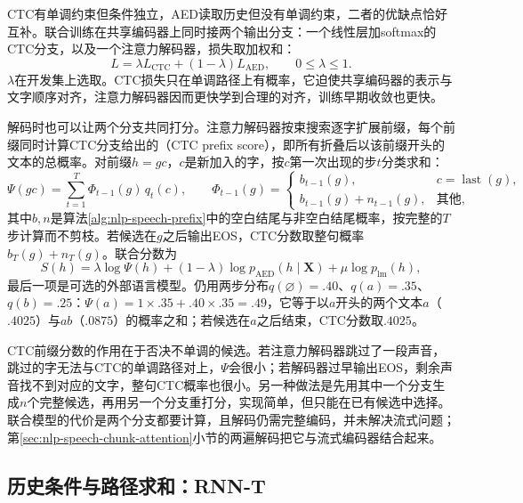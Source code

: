 CTC有单调约束但条件独立，AED读取历史但没有单调约束，二者的优缺点恰好互补。联合训练在共享编码器上同时接两个输出分支：一个线性层加softmax的CTC分支，以及一个注意力解码器，损失取加权和：
\begin{equation}
 L=\lambda L_{\mathrm{CTC}}+(1-\lambda)L_{\mathrm{AED}},\qquad 0\leq\lambda\leq1.
 \label{eq:nlp-speech-joint-loss}
\end{equation}
$\lambda$在开发集上选取。CTC损失只在单调路径上有概率，它迫使共享编码器的表示与文字顺序对齐，注意力解码器因而更快学到合理的对齐，训练早期收敛也更快。

解码时也可以让两个分支共同打分。注意力解码器按束搜索逐字扩展前缀，每个前缀同时计算CTC分支给出的（CTC prefix score），即所有折叠后以该前缀开头的文本的总概率。对前缀$h=gc$，$c$是新加入的字，按$c$第一次出现的步$t$分类求和：
\begin{equation}
 \Psi(gc)=\sum_{t=1}^{T}\Phi_{t-1}(g)\,q_t(c),\qquad
 \Phi_{t-1}(g)=\begin{cases}
   b_{t-1}(g), & c=\operatorname{last}(g),\\
   b_{t-1}(g)+n_{t-1}(g), & \text{其他},
 \end{cases}
 \label{eq:nlp-speech-ctc-prefix-score}
\end{equation}
其中$b,n$是算法\ref{alg:nlp-speech-prefix}中的空白结尾与非空白结尾概率，按完整的$T$步计算而不剪枝。若候选在$g$之后输出EOS，CTC分数取整句概率$b_T(g)+n_T(g)$。联合分数为
\begin{equation}
 S(h)=\lambda\log\Psi(h)+(1-\lambda)\log p_{\mathrm{AED}}(h\mid\bm{X})
      +\mu\log p_{\mathrm{lm}}(h),
 \label{eq:nlp-speech-joint-score}
\end{equation}
最后一项是可选的外部语言模型。仍用两步分布$q(\varnothing)=.40$、$q(a)=.35$、$q(b)=.25$：$\Psi(a)=1\times.35+.40\times.35=.49$，它等于以$a$开头的两个文本$a$（$.4025$）与$ab$（$.0875$）的概率之和；若候选在$a$之后结束，CTC分数取$.4025$。

CTC前缀分数的作用在于否决不单调的候选。若注意力解码器跳过了一段声音，跳过的字无法与CTC的单调路径对上，$\Psi$会很小；若解码器过早输出EOS，剩余声音找不到对应的文字，整句CTC概率也很小。另一种做法是先用其中一个分支生成$n$个完整候选，再用另一个分支重打分，实现简单，但只能在已有候选中选择。联合模型的代价是两个分支都要计算，且解码仍需完整编码，并未解决流式问题；第\ref{sec:nlp-speech-chunk-attention}小节的两遍解码把它与流式编码器结合起来。

\subsection{历史条件与路径求和：RNN-T}
\label{sec:nlp-speech-rnnt}

